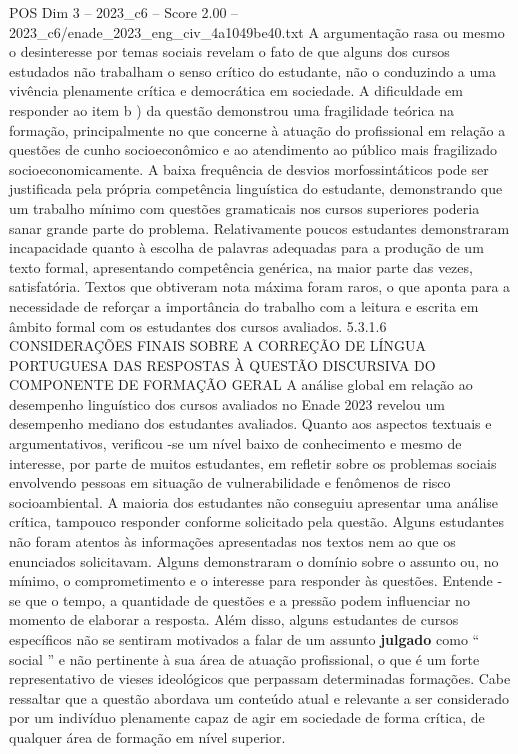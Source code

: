 \begin{textsample}{POS Dim 3 – 2023\_c6 – Score 2.00 – 2023\_c6/enade\_2023\_eng\_civ\_4a1049be40.txt}
A argumentação rasa ou mesmo o desinteresse por temas sociais revelam o fato de que alguns dos cursos estudados não trabalham o senso crítico do estudante, não o conduzindo a uma vivência plenamente crítica e democrática em sociedade.
A dificuldade em responder ao item b ) da questão demonstrou uma fragilidade teórica na formação, principalmente no que concerne à atuação do profissional em relação a questões de cunho socioeconômico e ao atendimento ao público mais fragilizado socioeconomicamente.
A baixa frequência de desvios morfossintáticos pode ser justificada pela própria competência linguística do estudante, demonstrando que um trabalho mínimo com questões gramaticais nos cursos superiores poderia sanar grande parte do problema.
Relativamente poucos estudantes demonstraram incapacidade quanto à escolha de palavras adequadas para a produção de um texto formal, apresentando competência genérica, na maior parte das vezes, satisfatória.
Textos que obtiveram nota máxima foram raros, o que aponta para a necessidade de reforçar a importância do trabalho com a leitura e escrita em âmbito formal com os estudantes dos cursos avaliados. 5.3.1.6 CONSIDERAÇÕES FINAIS SOBRE A CORREÇÃO DE LÍNGUA PORTUGUESA DAS RESPOSTAS À QUESTÃO DISCURSIVA DO COMPONENTE DE FORMAÇÃO GERAL A análise global em relação ao desempenho linguístico dos cursos avaliados no Enade 2023 revelou um desempenho mediano dos estudantes avaliados.
Quanto aos aspectos textuais e argumentativos, verificou -se um nível baixo de conhecimento e mesmo de interesse, por parte de muitos estudantes, em refletir sobre os problemas sociais envolvendo pessoas em situação de vulnerabilidade e fenômenos de risco socioambiental.
A maioria dos estudantes não conseguiu apresentar uma análise crítica, tampouco responder conforme solicitado pela questão.
Alguns estudantes não foram atentos às informações apresentadas nos textos nem ao que os enunciados solicitavam.
Alguns demonstraram o domínio sobre o assunto ou, no mínimo, o comprometimento e o interesse para responder às questões.
Entende -se que o tempo, a quantidade de questões e a pressão podem influenciar no momento de elaborar a resposta.
Além disso, alguns estudantes de cursos específicos não se sentiram motivados a falar de um assunto \textbf{julgado} como “ social ” e não pertinente à sua área de atuação profissional, o que é um forte representativo de vieses ideológicos que perpassam determinadas formações.
Cabe ressaltar que a questão abordava um conteúdo atual e relevante a ser considerado por um indivíduo plenamente capaz de agir em sociedade de forma crítica, de qualquer área de formação em nível superior.

\end{textsample}
